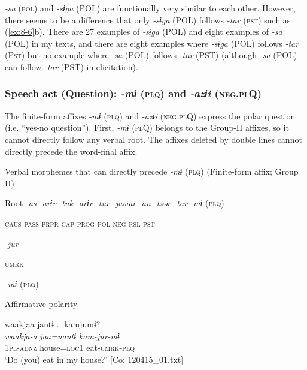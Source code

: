 \textit{-sa} (\textsc{pol}) and \textit{-sɨga} (POL) are functionally very similar to each other. However, there seems to be a difference that only \textit{-sɨga} (POL) follows \textit{-tar} (\textsc{pst}) such as (\ref{ex:8-6}b). There are 27 examples of \textit{-sɨga} (POL) and eight examples of \textit{-sa} (POL) in my texts, and there are eight examples where \textit{-sɨga} (POL) follows \textit{-tar} (P\textsc{st}) but no example where \textit{-sa} (POL) follows \textit{-tar} (PST) (although \textit{-sa} (POL) can follow \textit{-tar} (PST) in elicitation).

\subsubsection{Speech act (Question): \textit{-mɨ} (\textsc{plq}) and \textit{-azɨi} (\textsc{neg}.\textsc{pl}Q)}

The finite-form affixes \textit{-mɨ} (\textsc{plq}) and \textit{-azɨi} (\textsc{neg}.\textsc{pl}Q) express the polar question (i.e. “yes-no question”).   First, \textit{-mɨ} (\textsc{pl}Q) belongs to the Group-II affixes, so it cannot directly follow any verbal root. The affixes deleted by double lines cannot directly precede the word-final affix.

\ea\label{ex:8-65}
  Verbal morphemes that can directly precede \textit{-mɨ} (\textsc{plq}) (Finite-form affix; Group II)

  Root  \textit{-as  -arɨr} %
\textit{-tuk  -arɨr  -tur  -jawur} %
\textit{-an  -təər  -tar  -mɨ} (\textsc{plq})

    \textsc{caus}  \textsc{pass}  \textsc{prpr}  \textsc{cap}  \textsc{prog}  \textsc{pol}  \textsc{neg}  \textsc{rsl}  \textsc{pst}

          \textit{-jur}

          \textsc{umrk}
\z

\ea\label{ex:8-66}
  \textit{-mɨ} (\textsc{plq})

\ea Affirmative polarity

  {\TM}
\glll  waakjaa  jantɨ ..  kamjumɨ?\\
\textit{waakja-a}  \textit{jaa=nantɨ}  \textit{kam-jur-mɨ}\\

    1\textsc{pl}-\textsc{adnz}  house=\textsc{loc}1  eat-\textsc{umrk}-\textsc{plq}\\
\glt ‘Do (you) eat in my house?’ [Co: 120415\_01.txt]


